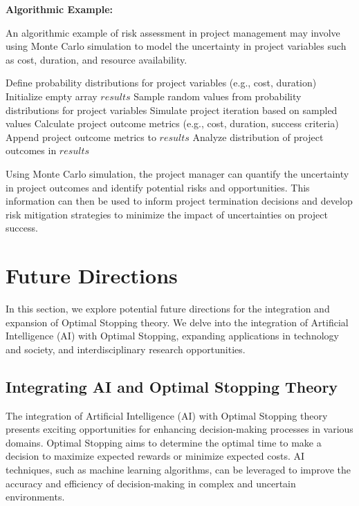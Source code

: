 \documentclass[12pt]{book} %
\begin{document}
\textbf{Algorithmic Example:}

An algorithmic example of risk assessment in project management may involve using Monte Carlo simulation to model the uncertainty in project variables such as cost, duration, and resource availability.
\FloatBarrier
\begin{algorithm}
\caption{Monte Carlo Simulation for Project Risk Assessment}\label{alg:montecarlo}
\begin{algorithmic}[1]
\State Define probability distributions for project variables (e.g., cost, duration)
\State Initialize empty array $results$
    \State Sample random values from probability distributions for project variables
    \State Simulate project iteration based on sampled values
    \State Calculate project outcome metrics (e.g., cost, duration, success criteria)
    \State Append project outcome metrics to $results$
\EndFor
\State Analyze distribution of project outcomes in $results$
\end{algorithmic}
\end{algorithm}
\FloatBarrier
Using Monte Carlo simulation, the project manager can quantify the uncertainty in project outcomes and identify potential risks and opportunities. This information can then be used to inform project termination decisions and develop risk mitigation strategies to minimize the impact of uncertainties on project success.

\section{Future Directions}

In this section, we explore potential future directions for the integration and expansion of Optimal Stopping theory. We delve into the integration of Artificial Intelligence (AI) with Optimal Stopping, expanding applications in technology and society, and interdisciplinary research opportunities.

\subsection{Integrating AI and Optimal Stopping Theory}

The integration of Artificial Intelligence (AI) with Optimal Stopping theory presents exciting opportunities for enhancing decision-making processes in various domains. Optimal Stopping aims to determine the optimal time to make a decision to maximize expected rewards or minimize expected costs. AI techniques, such as machine learning algorithms, can be leveraged to improve the accuracy and efficiency of decision-making in complex and uncertain environments.
\end{document}
